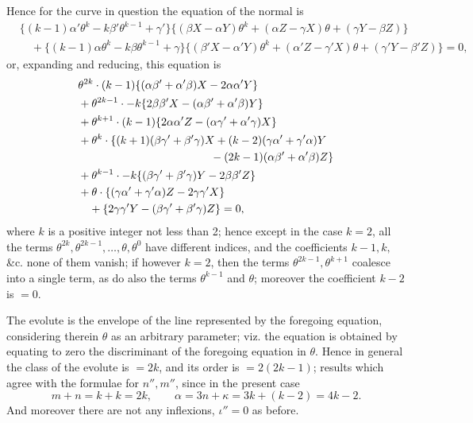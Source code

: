 ﻿\documentclass[11pt,a4paper]{article}
\theoremstyle{plain}
\theoremstyle{definition}
\begin{document}
Hence for the curve in question the equation of the normal is
\[
\begin{aligned}
&\{(k-1)\alpha'\theta^k-k\beta'\theta^{k-1}+\gamma'\}
  \{(\beta X-\alpha Y)\theta^k+(\alpha Z-\gamma X)\theta+(\gamma Y-\beta Z)\}\\
&\quad+
\{(k-1)\alpha\theta^k-k\beta\theta^{k-1}+\gamma\}
  \{(\beta'X-\alpha'Y)\theta^k+(\alpha'Z-\gamma'X)\theta+(\gamma'Y-\beta'Z)\}=0,
\end{aligned}
\]
or, expanding and reducing, this equation is
\[
\begin{aligned}
&\theta^{2k}\cdot(k-1)\{(\alpha\beta'+\alpha'\beta)X-2\alpha\alpha'Y\}\\
&+\theta^{2k-1}\cdot
   -k\{2\beta\beta'X-(\alpha\beta'+\alpha'\beta)Y\}\\
&+\theta^{k+1}\cdot(k-1)\{2\alpha\alpha'Z-(\alpha\gamma'+\alpha'\gamma)X\}\\
&+\theta^k\cdot\{(k+1)(\beta\gamma'+\beta'\gamma)X
 +(k-2)(\gamma\alpha'+\gamma'\alpha)Y\\
&\hspace{4.2cm}-(2k-1)(\alpha\beta'+\alpha'\beta)Z\}\\
&+\theta^{k-1}\cdot
   -k\{(\beta\gamma'+\beta'\gamma)Y-2\beta\beta'Z\}\\
&+\theta\cdot\{(\gamma\alpha'+\gamma'\alpha)Z-2\gamma\gamma'X\}\\
&\quad+\{2\gamma\gamma'Y-(\beta\gamma'+\beta'\gamma)Z\}=0,
\end{aligned}
\]
where \(k\) is a positive integer not less than 2; hence except in the
case \(k=2\), all the terms
\(\theta^{2k},\theta^{2k-1},\ldots,\theta,\theta^0\) have different
indices, and the coefficients \(k-1,k,\) \&c. none of them vanish; if
however \(k=2\), then the terms \(\theta^{2k-1},\theta^{k+1}\) coalesce
into a single term, as do also the terms \(\theta^{k-1}\) and \(\theta\);
moreover the coefficient \(k-2\) is \(=0\).

The evolute is the envelope of the line represented by the foregoing
equation, considering therein \(\theta\) as an arbitrary parameter; viz.
the equation is obtained by equating to zero the discriminant of the
foregoing equation in \(\theta\). Hence in general the class of the evolute
is \(=2k\), and its order is \(=2(2k-1)\); results which agree with the
formulae for \(n'',m''\), since in the present case
\[
m+n=k+k=2k,\qquad
\alpha=3n+\kappa=3k+(k-2)=4k-2.
\]
And moreover there are not any inflexions, \(\iota''=0\) as before.
\end{document}
